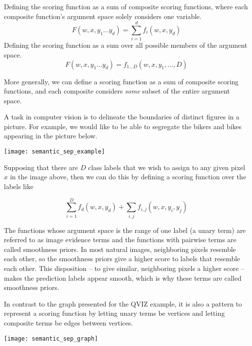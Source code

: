 \documentclass[../main.tex]{subfiles}
\begin{document}
    \begin{outline}
        \1 Defining the scoring function as a sum of composite scoring functions, where
        each composite function's argument space solely considers one variable.
        \2 
        \[
            F(w, x, y_1 \dots y_d) = \sum_{i=1}^{d}f_i(w,x,y_d)
        \]
        \1 Defining the scoring function as a sum over all possible members of the
        argument space.
        \[
            F(w, x, y_1 \dots y_d) = f_{1 \dots D}(w,x,y_1, \dots, D)
        \]
    \end{outline}

    More generally, we can define a scoring function as a sum of composite scoring
    functions, and each composite considers \textit{some} subset of the entire argument space.
    \begin{example}

    A task in computer vision is to delineate the boundaries of distinct figures in a picture. For example, we would like to be able to segregate the bikers and bikes appearing in the picture below.

    \begin{center}
        \texttt{[image: semantic\_sep\_example]}
    \end{center}

    Supposing that there are $D$ class labels that we wish to assign to any given pixel $x$ in the image above, then we can do this by defining a scoring function over the labels like

    \[
        \sum_{i=1}^{D}f_d(w, x, y_d) + \sum_{i,j}^{}f_{i,j}(w,x,y_i,y_j)
    \]

    The functions whose argument space is the range of one label (a unary term) are referred to as image evidence terms and the functions with pairwise terms are called smoothness priors. In most natural images, neighboring pixels resemble each other, so the smoothness priors give a higher score to labels that resemble each other. This disposition -- to give similar, neighboring pixels a higher score -- makes the prediction labels appear smooth, which is why these terms are called smoothness priors.

    In contrast to the graph presented for the QVIZ example, it is also a pattern to represent a scoring function by letting unary terms be vertices and letting composite terms be edges between vertices.

    \begin{center}
        \texttt{[image: semantic\_sep\_graph]}
    \end{center}
        
    \end{example}
\end{document}
